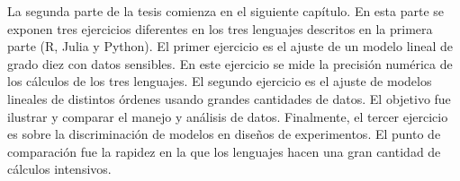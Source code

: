La segunda parte de la tesis comienza en el siguiente capítulo. En esta parte se exponen tres ejercicios diferentes en los tres lenguajes descritos en la primera parte (\textsf{R, Julia} y \textsf{Python}). El primer ejercicio es el ajuste de un modelo lineal de grado diez con datos sensibles. En este ejercicio se mide la precisión numérica de los cálculos de los tres lenguajes. El segundo ejercicio es el ajuste de modelos lineales de distintos órdenes usando grandes cantidades de datos. El objetivo fue ilustrar y comparar el manejo y análisis de datos. Finalmente, el tercer ejercicio es sobre la discriminación de modelos en diseños de experimentos. El punto de comparación fue la rapidez en la que los lenguajes hacen una gran cantidad de cálculos intensivos. 


